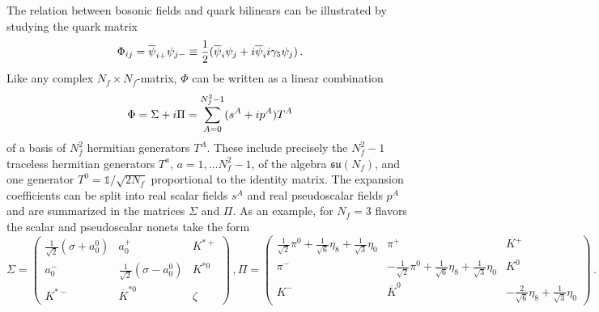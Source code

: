 The relation between bosonic fields and quark bilinears can be illustrated by studying the quark matrix
\begin{equation}
    \Phi_{ij}=\overline{\psi}_{i+}\psi_{j-}\equiv\frac{1}{2}(\overline{\psi}_i\psi_j+{i}\overline{\psi}_i{i}\gamma_5\psi_j)\,.
    \label{eq:QuarkMatrixDef}
\end{equation}
Like any complex $N_f\times N_f$-matrix, $\Phi$ can be written as a linear combination
\begin{equation}
    \Phi=\Sigma+{i}\Pi=\sum_{A=0}^{N_f^2-1}(s^A+{i} p^A)T^A
    \label{eq:QuarkMatrixExpansion}
\end{equation}
of a basis of $N_f^2$ hermitian generators $T^A$. These include precisely the $N_f^2-1$ traceless hermitian generators $T^a$, ${a=1,\dots N_f^2-1}$, of the algebra $\mathfrak{su}(N_f)$, and one generator $T^0=\mathbb{1}/\sqrt{2N_f}$ proportional to the identity matrix. The expansion coefficients can be split into real scalar fields $s^A$ and real pseudoscalar fields $p^A$ and are summarized in the matrices $\Sigma$ and $\Pi$. As an example, for $N_f=3$ flavors the scalar and pseudoscalar nonets take the form \cite{Schaffner-BielichRandrup_1999}
\begin{subequations}
    \begin{equation}
        \Sigma=\begin{pmatrix}
            \frac{1}{\sqrt{2}}(\sigma+a_0^0)&a_0^+&K^{*+}\\
            a_0^-&\frac{1}{\sqrt{2}}(\sigma-a_0^0)&K^{*0}\\
            K^{*-}&\overline{K}^{*0}&\zeta
        \end{pmatrix}\,,
        \label{eq:QuarkMatrixSU3_scalar}
    \end{equation}
    \begin{equation}
        \Pi=\begin{pmatrix}
            \frac{1}{\sqrt{2}}\pi^0+\frac{1}{\sqrt{6}}\eta_8+\frac{1}{\sqrt{3}}\eta_0&\pi^+&K^+\\
            \pi^-&-\frac{1}{\sqrt{2}}\pi^0+\frac{1}{\sqrt{6}}\eta_8+\frac{1}{\sqrt{3}}\eta_0&K^0\\
            K^-&\overline{K}^0&-\frac{2}{\sqrt{6}}\eta_8+\frac{1}{\sqrt{3}}\eta_0
        \end{pmatrix}\,.
        \label{eq:QuarkMatrixSU3_pseudoscalar}
    \end{equation}
    \label{eq:QuarkMatrixSU3}
\end{subequations}

